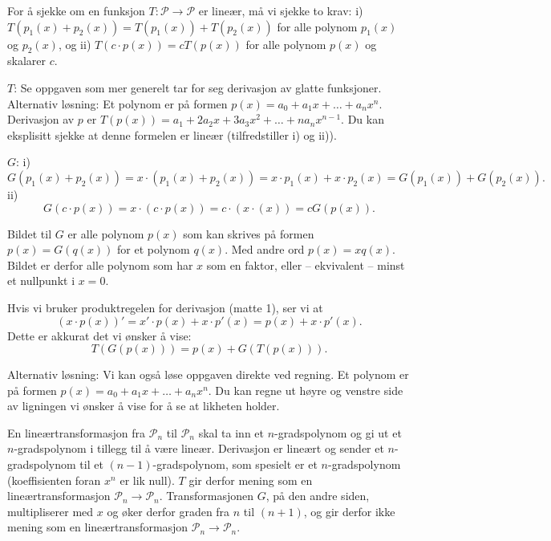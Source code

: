 \begin{losning}
\begin{punkt}
For å sjekke om en funksjon $T:\mathcal{P}\rightarrow \mathcal{P}$ er lineær, må vi sjekke to krav: i) $T(p_1(x)+p_2(x))=T(p_1(x))+T(p_2(x))$ for alle polynom $p_1(x)$ og $p_2(x)$, og ii) $T(c\cdot p(x))=cT(p(x))$ for alle polynom $p(x)$ og skalarer $c$.


\noindent
$T$: Se oppgaven som mer generelt tar for seg derivasjon av glatte funksjoner. Alternativ løsning: Et polynom er på formen $p(x)=a_0+a_1x+\dots +a_nx^n$. Derivasjon av $p$ er $T(p(x))=a_1+2a_2x+3a_3x^2+\dots+na_nx^{n-1}$. Du kan eksplisitt sjekke at denne formelen er lineær (tilfredstiller i) og ii)).


\noindent
$G$: i) $$G(p_1(x)+p_2(x))=x\cdot(p_1(x)+p_2(x))=x\cdot p_1(x)+x\cdot p_2(x)=G(p_1(x))+G(p_2(x)).$$ ii) $$G(c\cdot p(x))=x\cdot(c\cdot p(x))=c\cdot(x\cdotp(x))=cG(p(x)).$$


\end{punkt}

\begin{punkt}
Bildet til $G$ er alle polynom $p(x)$ som kan skrives på formen $p(x)=G(q(x))$ for et polynom $q(x)$. Med andre ord $p(x)=xq(x)$. Bildet er derfor alle polynom som har $x$ som en faktor, eller -- ekvivalent -- minst et nullpunkt i $x=0$.
\end{punkt}

\begin{punkt}
Hvis vi bruker produktregelen for derivasjon (matte 1), ser vi at 
$$(x\cdot p(x))'=x'\cdot p(x)+x\cdot p'(x)=p(x)+x\cdot p'(x).$$
Dette er akkurat det vi ønsker å vise:
$$T(G(p(x)))=p(x)+G(T(p(x))).$$

\noindent
Alternativ løsning: Vi kan også løse oppgaven direkte ved regning. Et polynom er på formen $p(x)=a_0+a_1x+\dots +a_nx^n$. Du kan regne ut høyre og venstre side av ligningen vi ønsker å vise for å se at likheten holder.
\end{punkt}

\begin{punkt}
En lineærtransformasjon fra $\mathcal{P}_n$ til $\mathcal{P}_n$ skal ta inn et $n$-gradspolynom og gi ut et $n$-gradspolynom i tillegg til å være lineær. Derivasjon er lineært og sender et $n$-gradspolynom til et $(n-1)$-gradspolynom, som spesielt er et $n$-gradspolynom (koeffisienten foran $x^n$ er lik null). $T$ gir derfor mening som en lineærtransformasjon $\mathcal{P}_n\rightarrow \mathcal{P}_n$. Transformasjonen $G$, på den andre siden, multipliserer med $x$ og øker derfor graden fra $n$ til $(n+1)$, og gir derfor ikke mening som en lineærtransformasjon $\mathcal{P}_n\rightarrow \mathcal{P}_n$.


\end{punkt}
\end{losning}
